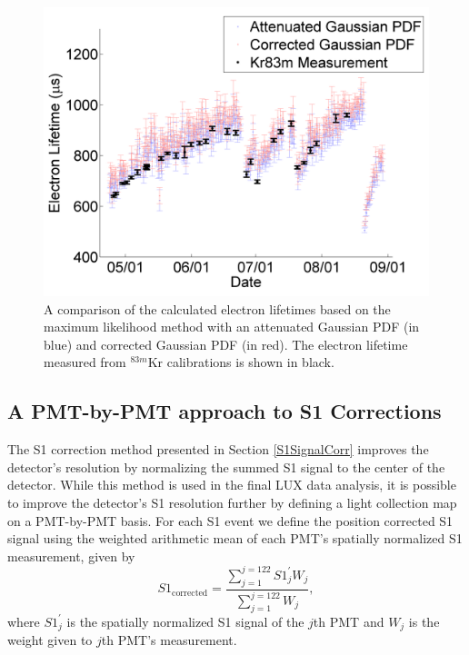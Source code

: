\documentclass[a4paper,12pt]{article}
\begin{document}
{\begin{figure}[h]\centering
\includegraphics[scale=0.6]{RadonLifetimeResults.png}
\caption{A comparison of the calculated electron lifetimes based on the maximum likelihood method with an attenuated Gaussian PDF (in blue) and corrected Gaussian PDF (in red).  The electron lifetime measured from $^{83m}$Kr calibrations is shown in black.}
\label{fig:RadonLifetimeResults}
\end{figure}



\subsection{A PMT-by-PMT approach to S1 Corrections}

The S1 correction method presented in Section \ref{S1SignalCorr} improves the detector's resolution by normalizing the summed S1 signal to the center of the detector.  While this method is used in the final LUX data analysis, it is possible to improve the detector's S1 resolution further by defining a light collection map on a PMT-by-PMT basis.  For each S1 event we define the position corrected S1 signal using the weighted arithmetic mean of each PMT's spatially normalized S1 measurement, given by
\begin{equation} \label{WeightedMean}
S1_{\mbox{corrected}} = \frac{\sum_{j=1}^{j=122} S1^{\prime}_{j} W_{j}} {\sum_{j=1}^{j=122} W_{j}},
\end{equation}
where $S1^{\prime}_{j}$ is the spatially normalized S1 signal of the $j$th PMT and $W_j$ is the weight given to $j$th PMT's measurement.

}
\end{document}
